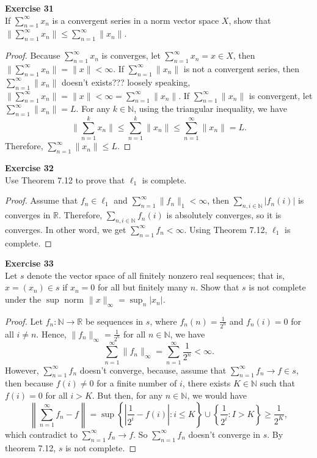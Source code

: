 \documentclass[12pt, a4paper]{article}
\theoremstyle{plain}
\newcommand{\N}{\mathbb{N}}
\newcommand{\R}{\mathbb{R}}
\newenvironment{exercise}[2][Exercise]
    { \begin{mdframed}[backgroundcolor=gray!20] \textbf{#1 #2} \\}
    {  \end{mdframed}}
\begin{document}
\begin{exercise}{31}
If $\sum_{n=1}^{\infty}{x_n}$ is a convergent series in a norm vector space $X$, show that $\|\sum_{n=1}^{\infty}{x_n}\|\leq \sum_{n=1}^{\infty}{\|x_n\|}$.
\end{exercise}
	\begin{proof}
	Because $\sum_{n=1}^{\infty}{x_n}$ is converges, let $\sum_{n=1}^{\infty}{x_n}=x\in X$, then $\|\sum_{n=1}^{\infty}{x_n}\|=\|x\|<\infty$. If $\sum_{n=1}^{\infty}{\|x_n\|}$ is not a convergent series, then $\sum_{n=1}^{\infty}{\|x_n\|}$ doesn't exists??? loosely speaking, $\|\sum_{n=1}^{\infty}{x_n}\|=\|x\|<\infty = \sum_{n=1}^{\infty}{\|x_n\|}$. If $\sum_{n=1}^{\infty}{\|x_n\|}$ is convergent, let $\sum_{n=1}^{\infty}{\|x_n\|}=L$. For any $k\in\N$, using the triangular inequality, we have
	\[
	\|\sum_{n=1}^{k}{x_n}\|\leq \sum_{n=1}^{k}{\|x_n\|}\leq \sum_{n=1}^{\infty}{\|x_n\|} = L.
	\]
	Therefore, $\sum_{n=1}^{\infty}{\|x_n\|}\leq L$.
	\end{proof}

\begin{exercise}{32}
Use Theorem 7.12 to prove that $\ell_1$ is complete.
\end{exercise}
	\begin{proof}
	Assume that $f_n\in \ell_1$ and $\sum_{n=1}^{\infty}{\|f_n\|_1}<\infty$, then $\sum_{n,i\in\N}|f_n(i)|$ is converges in $\R$. Therefore, $\sum_{n,i\in\N}f_n(i)$ is absolutely converges, so it is converges. In other word, we get $\sum_{n=1}^{\infty}{f_n}<\infty$. Using Theorem 7.12, $\ell_1$ is complete.
	\end{proof}

\begin{exercise}{33}
Let $s$ denote the vector space of all finitely nonzero real sequences; that is, $x=(x_n)\in s$ if $x_n=0$ for all but finitely many $n$. Show that $s$ is not complete under the $\sup$ norm $\|x\|_\infty=\sup_n|x_n|$.
\end{exercise}
	\begin{proof}
	Let $f_n:\N\rightarrow \R$ be sequences in $s$, where $f_n(n)=\frac{1}{2^n}$ and $f_n(i)=0$ for all $i\neq n$. Hence, $\|f_n\|_\infty = \frac{1}{2^n}$ for all $n\in\N$, we have
	\[
	\sum_{n=1}^{\infty}{\|f_n\|_\infty}=\sum_{n=1}^{\infty}{\frac{1}{2^n}}<\infty.
	\]
	However, $\sum_{n=1}^{\infty}{f_n}$ doesn't converge, because, assume that $\sum_{n=1}^{\infty}{f_n}\rightarrow f\in s$, then because $f(i)\neq 0$ for a finite number of $i$, there exists $K\in \N$ such that $f(i)=0$ for all $i>K$. But then, for any $n\in\N$, we would have
	\[
	\left\|\sum_{n=1}^{\infty}{f_n}-f\right\|=\sup\left\{\left|\frac{1}{2^i}-f(i)\right|:i\leq K\right\}\cup \left\{\frac{1}{2^i}:I>K\right\}\geq \frac{1}{2^K},
	\]
	which contradict to $\sum_{n=1}^{\infty}{f_n}\rightarrow f$. So $\sum_{n=1}^{\infty}{f_n}$ doesn't converge in $s$. By theorem 7.12, $s$ is not complete.
	\end{proof}
\end{document}
